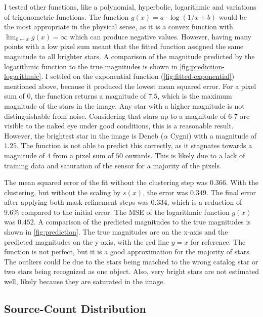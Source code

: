 I tested other functions, like a polynomial, hyperbolic, logarithmic and variations of
trigonometric functions. The function $g(x) = a \cdot \log(1 / x + b)$ would be the most
appropriate in the physical sense, as it is a convex function with $\lim_{0 \leftarrow x}
  g(x) = \infty$ which can produce negative values. However, having many points with a low
pixel sum meant that the fitted function assigned the same magnitude to all brighter
stars. A comparison of the magnitude predicted by the logarithmic function to the true
magnitudes is shown in \autoref{fig:prediction-logarithmic}. I settled on the exponential
function (\autoref{fig:fitted-exponential}) mentioned above, because it produced the
lowest mean squared error. For a pixel sum of 0, the function returns a magnitude of
$7.5$, which is the maximum magnitude of the stars in the image. Any star with a higher
magnitude is not distinguishable from noise. Considering that stars up to a magnitude of
6-7 are visible to the naked eye under good conditions, this is a reasonable result.
However, the brightest star in the image is Deneb ($\alpha$ Cygni) with a magnitude of
$1.25$. The function is not able to predict this correctly, as it stagnates towards a
magnitude of $4$ from a pixel sum of $50$ onwards. This is likely due to a lack of
training data and saturation of the sensor for a majority of the pixels.

The mean squared error of the fit without the clustering step was $0.366$. With the
clustering, but without the scaling by $s(x)$, the error was $0.349$. The final error
after applying both mask refinement steps was $0.334$, which is a reduction of $9.6\%$
compared to the initial error. The MSE of the logarithmic function $g(x)$ was $0.452$. A
comparison of the predicted magnitudes to the true magnitudes is shown in
\autoref{fig:prediction}. The true magnitudes are on the x-axis and the predicted
magnitudes on the y-axis, with the red line $y = x$ for reference. The function is not
perfect, but it is a good approximation for the majority of stars. The outliers could be
due to the stars being matched to the wrong catalog star or two stars being recognized as
one object. Also, very bright stars are not estimated well, likely because they are
saturated in the image.

\subsection{Source-Count Distribution}
\label{sec:source-count-distribution}

